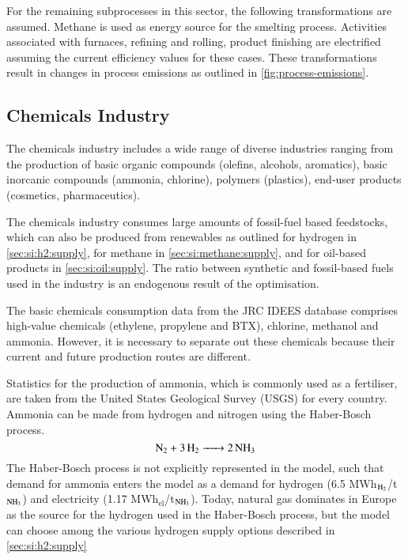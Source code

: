 For the remaining subprocesses in this sector, the following transformations are
assumed. Methane is used as energy source for the smelting process. Activities
associated with furnaces, refining and rolling, product finishing are
electrified assuming the current efficiency values for these cases.
These transformations result in changes in process emissions as outlined in \cref{fig:process-emissions}.

\subsection{Chemicals Industry}
\label{sec:si:industry:chemicals}

The chemicals industry includes a wide range of diverse industries ranging from
the production of basic organic compounds (olefins, alcohols, aromatics), basic
inorcanic compounds (ammonia, chlorine), polymers (plastics), end-user products
(cosmetics, pharmaceutics).

The chemicals industry consumes large amounts of fossil-fuel based feedstocks,
 which can also be produced from renewables as
outlined for hydrogen in \cref{sec:si:h2:supply}, for methane in
\cref{sec:si:methane:supply}, and for oil-based products in
\cref{sec:si:oil:supply}. The ratio between synthetic and fossil-based fuels
used in the industry is an endogenous result of the optimisation.

The basic chemicals consumption data from the JRC IDEES database
comprises high-value chemicals (ethylene, propylene and BTX), chlorine, methanol
and ammonia. However, it is necessary to separate out these chemicals because
their current and future production routes are different.

Statistics for the production of ammonia, which is commonly used as a
fertiliser, are taken from the United States Geological Survey (USGS) for every
country. Ammonia can
be made from hydrogen and nitrogen using the Haber-Bosch process.
\begin{equation}
    \ce{N2 + 3H2 -> 2NH3}
\end{equation}
The Haber-Bosch process is not explicitly represented in the model, such that
demand for ammonia enters the model as a demand for hydrogen (6.5
MWh$_{\ce{H2}}$/t$_{\ce{NH3}}$) and electricity (1.17 MWh$_{\text{el}}$/t$_{\ce{NH3}}$).
 Today, natural gas dominates in Europe as the source for
the hydrogen used in the Haber-Bosch process, but the model can choose among the
various hydrogen supply options described in
\cref{sec:si:h2:supply}

